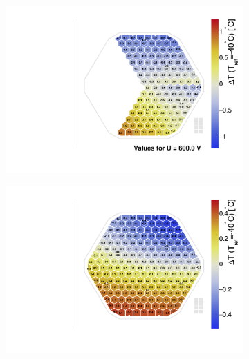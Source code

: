 \begin{figure}
	\captionsetup[subfigure]{aboveskip=-1pt,belowskip=-1pt}
	\centering
	\begin{subfigure}[b]{0.32\textwidth}
		\includegraphics[width=0.999\textwidth]{plots/chuck_temp_correction/Spring2021_ALPS.pdf}
		\subcaption{
		}
		\label{plot:chucktemp_before}
	\end{subfigure}
	\hfill
	\begin{subfigure}[b]{0.32\textwidth}
		\includegraphics[width=0.999\textwidth]{plots/chuck_temp_correction/Spring2021_ALPS_deltaT.pdf}
		\subcaption{
		}
		\label{plot:chucktemp_correction}
	\end{subfigure}
	\hfill
	\begin{subfigure}[b]{0.32\textwidth}

\end{subfigure}
\end{figure}
